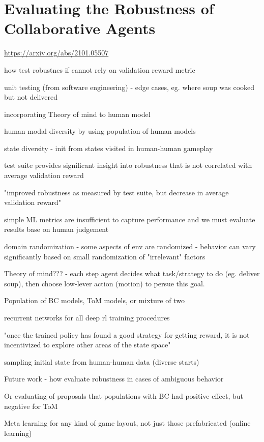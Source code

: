 \documentclass{report}
\begin{document}
\section{Evaluating the Robustness of Collaborative Agents}
\url{https://arxiv.org/abs/2101.05507}
\begin{list}{}{}
    \item how test robustnes if cannot rely on validation reward metric
    \item unit testing (from software engineering) - edge cases, eg. where soup was cooked but not delivered
    \item incorporating Theory of mind to human model 
    \item human modal diversity by using population of human models
    \item state diversity - init from states visited in human-human gameplay
    \item test suite provides significant insight into robustness that is not correlated with average validation reward
    \item "improved robustness as measured by test suite, but decrease in average validation reward"
    \item simple ML metrics are insufficient to capture performance and we must evaluate results base on human judgement
    \item domain randomization - some aspects of env are randomized - behavior can vary significantly based on small randomization of "irrelevant" factors
    \item Theory of mind??? - each step agent decides what task/strategy to do (eg. deliver soup), then choose low-lever action (motion) to persue this goal.
    \item Population of BC models, ToM models, or mixture of two
    \item recurrent networks for all deep rl training procedures
    \item "once the trained policy has
    found a good strategy for getting reward, it is not incentivized to explore other areas of the state space"
    \item sampling initial state from human-human data (diverse starts)
    \item Future work - how evaluate robustness in cases of ambiguous behavior
    \item Or evaluating of proposals that populations with BC had positive effect, but negative for ToM
    \item Meta learning for any kind of game layout, not just those prefabricated (online learning)
\end{list}
\end{document}
